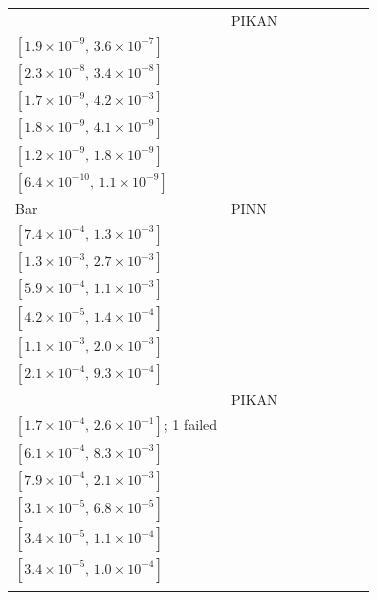 \begin{tabular}{llcccccc}
 & PIKAN & \makecell{$2.7{\times}10^{-8}$\\{\scriptsize$[1.9{\times}10^{-9},\,3.6{\times}10^{-7}]$}} & \makecell{$2.8{\times}10^{-8}$\\{\scriptsize$[2.3{\times}10^{-8},\,3.4{\times}10^{-8}]$}} & \makecell{$2.7{\times}10^{-6}$\\{\scriptsize$[1.7{\times}10^{-9},\,4.2{\times}10^{-3}]$}} & \makecell{$2.7{\times}10^{-9}$\\{\scriptsize$[1.8{\times}10^{-9},\,4.1{\times}10^{-9}]$}} & \makecell{$1.5{\times}10^{-9}$\\{\scriptsize$[1.2{\times}10^{-9},\,1.8{\times}10^{-9}]$}} & \makecell{$\mathbf{8.3{\times}10^{-10}}$\\{\scriptsize$[6.4{\times}10^{-10},\,1.1{\times}10^{-9}]$}}\\
\addlinespace
Bar & PINN & \makecell{$9.8{\times}10^{-4}$\\{\scriptsize$[7.4{\times}10^{-4},\,1.3{\times}10^{-3}]$}} & \makecell{$1.9{\times}10^{-3}$\\{\scriptsize$[1.3{\times}10^{-3},\,2.7{\times}10^{-3}]$}} & \makecell{$7.9{\times}10^{-4}$\\{\scriptsize$[5.9{\times}10^{-4},\,1.1{\times}10^{-3}]$}} & \makecell{$\mathbf{7.6{\times}10^{-5}}$\\{\scriptsize$[4.2{\times}10^{-5},\,1.4{\times}10^{-4}]$}} & \makecell{$1.5{\times}10^{-3}$\\{\scriptsize$[1.1{\times}10^{-3},\,2.0{\times}10^{-3}]$}} & \makecell{$4.5{\times}10^{-4}$\\{\scriptsize$[2.1{\times}10^{-4},\,9.3{\times}10^{-4}]$}}\\
 & PIKAN & \makecell{$6.7{\times}10^{-3}$\\{\scriptsize$[1.7{\times}10^{-4},\,2.6{\times}10^{-1}]$; 1 failed}} & \makecell{$2.2{\times}10^{-3}$\\{\scriptsize$[6.1{\times}10^{-4},\,8.3{\times}10^{-3}]$}} & \makecell{$1.3{\times}10^{-3}$\\{\scriptsize$[7.9{\times}10^{-4},\,2.1{\times}10^{-3}]$}} & \makecell{$\mathbf{4.6{\times}10^{-5}}$\\{\scriptsize$[3.1{\times}10^{-5},\,6.8{\times}10^{-5}]$}} & \makecell{$6.0{\times}10^{-5}$\\{\scriptsize$[3.4{\times}10^{-5},\,1.1{\times}10^{-4}]$}} & \makecell{$5.8{\times}10^{-5}$\\{\scriptsize$[3.4{\times}10^{-5},\,1.0{\times}10^{-4}]$}}\\
\addlinespace

\end{tabular}
